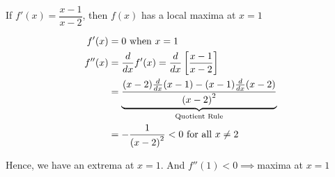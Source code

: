 \documentclass[14pt,fleqn]{extarticle}
\newcommand\dfx{ \dfrac{x-1}{x-2} }
\newcommand\ddfx{ -\frac{1}{\left(x-2 \right)^2}}
\begin{document}
 
\begin{snippet}
    \correct
    
    If $f'(x) = \dfx$, then $f(x)$ has a local maxima at $x = 1$ 
    
    
    \reason
    
    \begin{align}
    f'(x) &= 0 \text{ when } x = 1 \\
	f''(x) &= \ddx f'(x) = \ddx \left[\dfx \right] \\
	&= \underbrace{\dfrac{(x-2)\ddx (x-1) - (x-1)\ddx (x-2)}{\left(x-2 \right)^2}}_{\text{Quotient Rule}} \\
	&= \ddfx < 0 \text{ for all }x \neq 2 
\end{align}

Hence, we have an extrema at $x=1$. And $f''(1) < 0 \implies $maxima at $x=1$ 
    
\end{snippet} 
\end{document}
